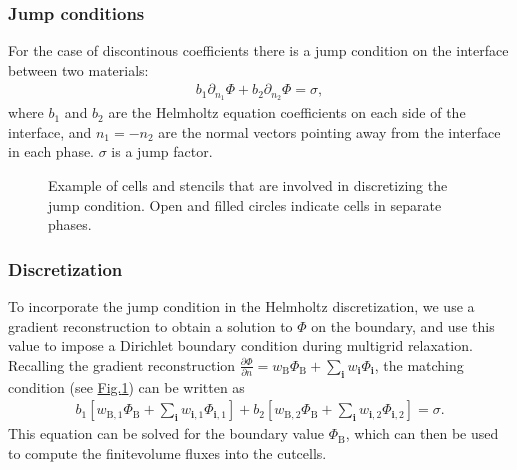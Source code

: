 \documentclass[letterpaper,10pt,english]{sphinxmanual}
\let\sphinxpxdimen\pdfpxdimen\else\newdimen\sphinxpxdimen
\begin{document}
\subsubsection{Jump conditions}
\label{\detokenize{Source/LinearSolvers:jump-conditions}}
For the case of discontinous coefficients there is a jump condition on the interface between two materials:
\begin{equation*}
\begin{split}b_1\partial_{n_1}\Phi + b_2\partial_{n_2}\Phi = \sigma,\end{split}
\end{equation*}
where \(b_1\) and \(b_2\) are the Helmholtz equation coefficients on each side of the interface, and \(n_1 = -n_2\) are the normal vectors pointing away from the interface in each phase.
\(\sigma\) is a jump factor.

\begin{figure}[htb]
\centering
\capstart

\noindent\sphinxincludegraphics[width=360\sphinxpxdimen]{{JumpCondition}.png}
\caption{Example of cells and stencils that are involved in discretizing the jump condition. Open and filled circles indicate cells in separate phases.}\label{\detokenize{Source/LinearSolvers:id6}}\label{\detokenize{Source/LinearSolvers:fig-jumpcondition}}\end{figure}


\subsubsection{Discretization}
\label{\detokenize{Source/LinearSolvers:discretization}}
To incorporate the jump condition in the Helmholtz discretization, we use a gradient reconstruction to obtain a solution to \(\Phi\) on the boundary, and use this value to impose a Dirichlet boundary condition during multigrid relaxation.
Recalling the gradient reconstruction \(\frac{\partial\Phi}{\partial n} = w_{\textrm{B}}\Phi_{\textrm{B}} + \sum_{\mathbf{i}} w_{\mathbf{i}}\Phi_{\mathbf{i}}\), the matching condition (see \hyperref[\detokenize{Source/LinearSolvers:fig-jumpcondition}]{Fig.\@ \ref{\detokenize{Source/LinearSolvers:fig-jumpcondition}}}) can be written as
\begin{equation*}
\begin{split}b_1\left[w_{\textrm{B},1}\Phi_{\textrm{B}} + \sum_{\mathbf{i}} w_{\mathbf{i},1}\Phi_{\mathbf{i},1}\right] + b_2\left[w_{\textrm{B},2}\Phi_{\textrm{B}} + \sum_{\mathbf{i}} w_{\mathbf{i},2}\Phi_{\mathbf{i},2}\right] = \sigma.\end{split}
\end{equation*}
This equation can be solved for the boundary value \(\Phi_{\textrm{B}}\), which can then be used to compute the finite\sphinxhyphen{}volume fluxes into the cut\sphinxhyphen{}cells.
\end{document}
